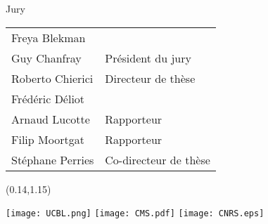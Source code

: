 \begin{titlepage}
\begin{center} \small
Jury \\
\begin{tabular}{L{5cm}l}
Freya Blekman & \\
Guy Chanfray & Président du jury \\
Roberto Chierici & Directeur de thèse \\
Frédéric Déliot & \\
Arnaud Lucotte & Rapporteur \\
Filip Moortgat & Rapporteur \\
Stéphane Perries & Co-directeur de thèse
\end{tabular}

\end{center}

\vfill

\begin{textblock}{1}(0.14,1.15)
\begin{center}
\texttt{[image: UCBL.png]} \hspace{1cm}  \hspace{1cm} \texttt{[image: CMS.pdf]} \hspace{1cm} \texttt{[image: CNRS.eps]}
\end{center}
\end{textblock}

\end{titlepage}